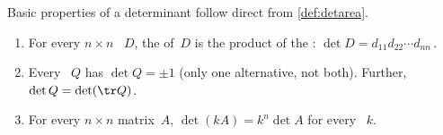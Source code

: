 Basic properties of a determinant follow direct from \autoref{def:detarea}.


\begin{theorem} \label{thm:basicdet}
\begin{enumerate}
\item \label{thm:basicdet:i}  For every \(n\times n\) ~\(D\),
the  of~\(D\) is the product of the : \(\det D=d_{11}d_{22}\cdots d_{nn}\)\,.
\item \label{thm:basicdet:ii}Every ~\(Q\) has  \(\det Q=\pm1\) (only one alternative, not both).
Further, \(\det Q=\det(\tr Q)\).
\item \label{thm:basicdet:iii}For every \(n\times n\) matrix~\(A\), \(\det(kA)=k^n\det A\) for every ~\(k\).
\end{enumerate}
\end{theorem}
